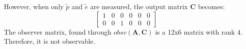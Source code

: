 However, when only $\tilde{p}$ and $\tilde{e}$ are measured, the
output matrix $\bm{C}$ becomes:
%
\begin{equation*}
  \begin{bmatrix}
    1 & 0 & 0 & 0 & 0 & 0 \\
    0 & 0 & 1 & 0 & 0 & 0
  \end{bmatrix}
\end{equation*}
%
The observer matrix, found through $obsv(\bm{A},\bm{C})$ is a 12x6
matrix with rank 4. Therefore, it is not observable.

